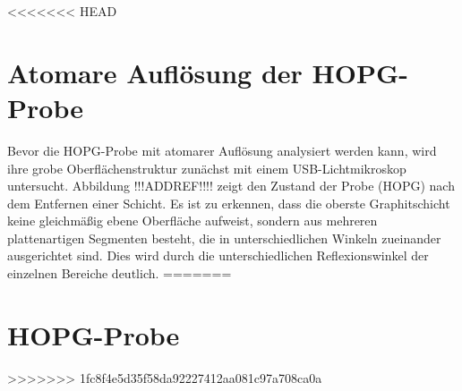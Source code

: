 <<<<<<< HEAD
\chapter{Atomare Auflösung der HOPG-Probe}
Bevor die HOPG-Probe mit atomarer Auflösung analysiert werden kann, wird ihre grobe Oberflächenstruktur zunächst mit einem USB-Lichtmikroskop untersucht. Abbildung !!!ADDREF!!!! zeigt den Zustand der Probe (HOPG) nach dem Entfernen einer Schicht. Es ist zu erkennen, dass die oberste Graphitschicht keine gleichmäßig ebene Oberfläche aufweist, sondern aus mehreren plattenartigen Segmenten besteht, die in unterschiedlichen Winkeln zueinander ausgerichtet sind. Dies wird durch die unterschiedlichen Reflexionswinkel der einzelnen Bereiche deutlich.
=======
\chapter{HOPG-Probe}
>>>>>>> 1fc8f4e5d35f58da92227412aa081c97a708ca0a





